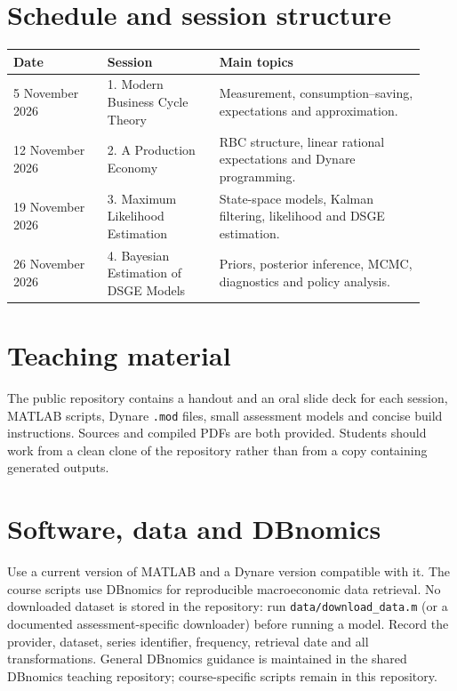 \documentclass[11pt,a4paper]{article}
\begin{document}
\section*{Schedule and session structure}
\begin{center}
\begin{tabular}{p{0.21\linewidth}p{0.25\linewidth}p{0.46\linewidth}}
\toprule
Date & Session & Main topics \\
\midrule
5 November 2026 & 1. Modern Business Cycle Theory & Measurement, consumption--saving, expectations and approximation. \\
12 November 2026 & 2. A Production Economy & RBC structure, linear rational expectations and Dynare programming. \\
19 November 2026 & 3. Maximum Likelihood Estimation & State-space models, Kalman filtering, likelihood and DSGE estimation. \\
26 November 2026 & 4. Bayesian Estimation of DSGE Models & Priors, posterior inference, MCMC, diagnostics and policy analysis. \\
\bottomrule
\end{tabular}
\end{center}

\section*{Teaching material}
The public repository contains a handout and an oral slide deck for each session, MATLAB scripts, Dynare \texttt{.mod} files, small assessment models and concise build instructions. Sources and compiled PDFs are both provided. Students should work from a clean clone of the repository rather than from a copy containing generated outputs.

\section*{Software, data and DBnomics}
Use a current version of MATLAB and a Dynare version compatible with it. The course scripts use DBnomics for reproducible macroeconomic data retrieval. No downloaded dataset is stored in the repository: run \texttt{data/download\_data.m} (or a documented assessment-specific downloader) before running a model. Record the provider, dataset, series identifier, frequency, retrieval date and all transformations. General DBnomics guidance is maintained in the shared DBnomics teaching repository; course-specific scripts remain in this repository.
\end{document}
